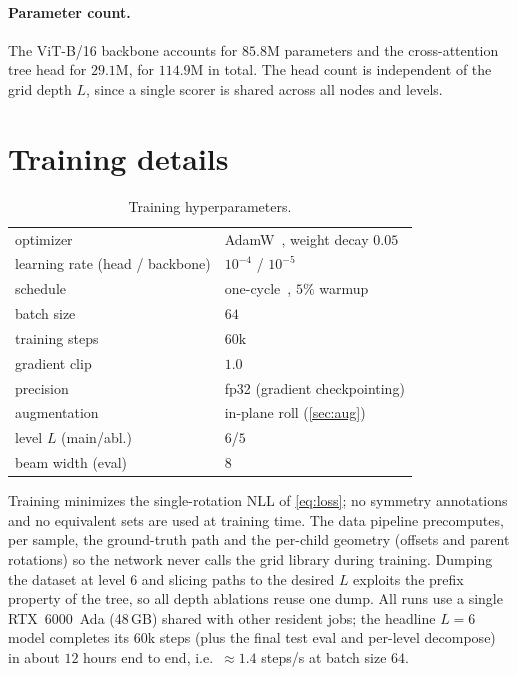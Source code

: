 \paragraph{Parameter count.}
The ViT-B/16 backbone accounts for $85.8$M parameters and the cross-attention
tree head for $29.1$M, for $114.9$M in total. The head count is independent of the
grid depth $L$, since a single scorer is shared across all nodes and levels.

\section{Training details}
\label{sec:supp-train}

\begin{table}[h]
\centering
\caption{Training hyperparameters.}
\label{tab:supp-hparams}
\small
\begin{tabular}{l l}
\toprule
optimizer & AdamW~\cite{loshchilov2019adamw}, weight decay $0.05$ \\
learning rate (head / backbone) & $10^{-4}$ / $10^{-5}$ \\
schedule & one-cycle~\cite{smith2019onecycle}, $5\%$ warmup \\
batch size & $64$ \\
training steps & $60\mathrm{k}$ \\
gradient clip & $1.0$ \\
precision & fp32 (gradient checkpointing) \\
augmentation & in-plane roll (\cref{sec:aug}) \\
level $L$ (main/abl.) & $6$/$5$ \\
beam width (eval) & $8$ \\
\bottomrule
\end{tabular}
\end{table}

Training minimizes the single-rotation NLL of \cref{eq:loss}; no symmetry
annotations and no equivalent sets are used at training time. The data pipeline
precomputes, per sample, the ground-truth path and the per-child geometry (offsets
and parent rotations) so the network never calls the grid library during training.
Dumping the dataset at level $6$ and slicing paths to the desired $L$ exploits the
prefix property of the tree, so all depth ablations reuse one dump. All runs use a
single RTX~6000~Ada (48\,GB) shared with other resident jobs; the headline $L{=}6$
model completes its $60$k steps (plus the final test eval and per-level decompose)
in about $12$ hours end to end, i.e.\ $\approx\!1.4$ steps/s at batch size $64$.

